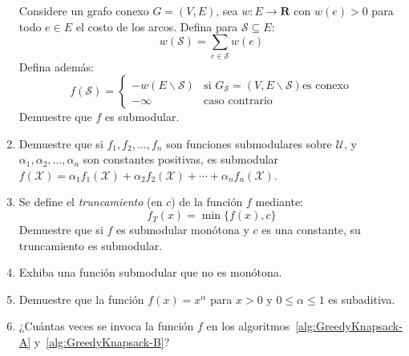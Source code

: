 \begin{enumerate}
    Considere un grafo conexo \(G = (V, E)\),
    sea \(w \colon E \to \mathbf{R}\) con \(w(e) > 0\) para todo \(e \in E\)
    el costo de los arcos.
    Defina para \(\mathscr{S} \subseteq E\):
    \begin{equation*}
      w(\mathscr{S})
        = \sum_{e \in \mathscr{S}} w(e)
    \end{equation*}
    Defina además:
    \begin{equation*}
      f(\mathscr{S})
        = \begin{cases}
            - w(E \smallsetminus \mathscr{S}) &
                \text{si \(G_{\mathscr{S}}
                             = (V, E \smallsetminus \mathscr{S})\)
                      es conexo} \\
            - \infty			      &
                \text{caso contrario}
          \end{cases}
    \end{equation*}
    Demuestre que \(f\) es submodular.
  \item
    Demuestre que si \(f_1, f_2, \dotsc, f_n\)
    son funciones submodulares sobre \(\mathscr{U}\),
    y \(\alpha_1, \alpha_2, \dotsc, \alpha_n\) son constantes positivas,
    es submodular
    \(f(\mathscr{X})
        = \alpha_1 f_1(\mathscr{X}) + \alpha_2 f_2(\mathscr{X})
            + \dotsb
            + \alpha_n f_n(\mathscr{X})\).
  \item
    Se define el \emph{truncamiento} (en \(c\)) de la función \(f\)
    mediante:
    \begin{equation*}
      f_T(x)
        = \min \{ f(x), c \}
    \end{equation*}
    Demuestre que si \(f\) es submodular monótona y \(c\) es una constante,
    su truncamiento es submodular.
  \item
    Exhiba una función submodular que no es monótona.
  \item
    Demuestre que la función \(f(x) = x^\alpha\)
    para \(x > 0\) y \(0 \le \alpha \le 1\) es subaditiva.
  \item
    ¿Cuántas veces se invoca la función \(f\)
    en los algoritmos~\ref{alg:GreedyKnapsack-A}
    y~\ref{alg:GreedyKnapsack-B}?
  \end{enumerate}




